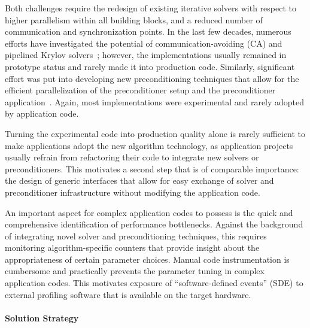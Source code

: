 Both challenges require the redesign of existing iterative solvers with respect 
to higher parallelism within all building blocks, and a reduced number of 
communication and synchronization points. In the last few decades, numerous efforts 
have investigated the potential of communication-avoiding (CA) and pipelined 
Krylov 
solvers~\cite{yamazakiipdps2014,Cornelis2018TheCC}; however, the 
implementations 
usually 
remained in prototype status and rarely made it into production code. 
Similarly, significant effort was put into developing new preconditioning 
techniques that allow for the efficient parallelization of the preconditioner 
setup and the preconditioner 
application~\cite{chowisc2015,anzteuropa2015,ANZT20181,doi:10.1137/16M1079506}. 
Again, most implementations were 
experimental and rarely adopted by application code.

Turning the experimental code into production quality alone is rarely 
sufficient to make applications adopt the new algorithm technology, as 
application projects usually refrain from refactoring their code to integrate 
new solvers or preconditioners. This motivates a second step that is of 
comparable importance: the design of generic interfaces that allow for easy 
exchange of solver and preconditioner infrastructure without modifying the 
application code.

An important aspect for complex application codes to possess is the quick and 
comprehensive identification of performance bottlenecks. Against the background 
of integrating novel solver and preconditioning techniques, this requires 
monitoring algorithm-specific counters that provide insight about the 
appropriateness of certain parameter choices. Manual code instrumentation is 
cumbersome and practically prevents the parameter tuning in complex application 
codes. This motivates exposure of ``software-defined events'' (SDE) to external 
profiling software that is available on the target hardware.


\paragraph{Solution Strategy}

